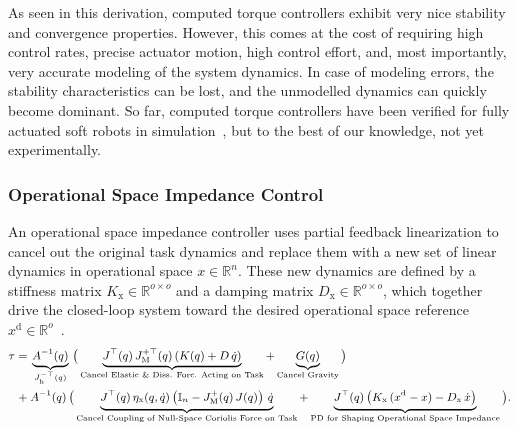 As seen in this derivation, computed torque controllers exhibit very nice stability and convergence properties. However, this comes at the cost of requiring high control rates, precise actuator motion, high control effort, and, most importantly, very accurate modeling of the system dynamics. In case of modeling errors, the stability characteristics can be lost, and the unmodelled dynamics can quickly become dominant.
So far, computed torque controllers have been verified for fully actuated soft robots in simulation~\citep{boyer2006macro, pustina2024unified}, but to the best of our knowledge, not yet experimentally.


\subsubsection{Operational Space Impedance Control}
An operational space impedance controller uses partial feedback linearization to cancel out the original task dynamics and replace them with a new set of linear dynamics in operational space $x \in \mathbb{R}^n$. These new dynamics are defined by a stiffness matrix $K_\mathrm{x} \in \mathbb{R}^{o \times o}$ and a damping matrix $D_\mathrm{x} \in \mathbb{R}^{o \times o}$, which together drive the closed-loop system toward the desired operational space reference $x^\mathrm{d} \in \mathbb{R}^o$~\citep{khatib1987unified, della2020model}.
\begin{equation}\small
\begin{split}
    \tau =& \: \underbrace{A^{-1}(q)}_{J_\mathrm{h}^{-\top}(q)} \, \big ( \underbrace{J^\top(q) \, J_\mathrm{M}^{+\top}(q) \left ( K(q) + D \, \dot{q} \right )}_\text{Cancel Elastic \& Diss. Forc. Acting on Task} + \underbrace{G(q)}_\text{Cancel Gravity} \big )\\
    + & \: A^{-1}(q) \, \big ( \underbrace{J^\top(q) \, \eta_\mathrm{x}(q,\dot{q}) \left ( \mathbb{I}_n - J_\mathrm{M}^{+}(q) \, J(q)  \right ) \, \dot{q}}_\text{Cancel Coupling of Null-Space Coriolis Force on Task} + \underbrace{J^\top(q) \left ( K_\mathrm{x} \, (x^\mathrm{d} - x) - D_\mathrm{x} \, \dot{x} \right )}_{\text{PD for Shaping Operational Space Impedance}} \big ).
\end{split}
\end{equation}
